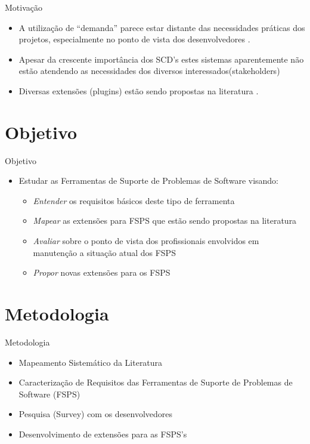 \documentclass[t,14pt,mathserif]{beamer}
\begin{document}
\begin{frame}{Motivação}

	\begin{itemize}
		\item A utilização de  ``demanda'' parece estar distante das necessidades práticas dos projetos, especialmente no ponto de vista dos desenvolvedores \cite{Baysal:2013:SAP:2486788.2486957}.
		\item Apesar da crescente importância dos SCD's estes sistemas aparentemente não estão atendendo as necessidades dos diversos interessados(stakeholders)
		\item Diversas extensões (plugins) estão sendo propostas na literatura \cite{101186,Thung:2014:BIT:2635868.2661678,Kononenko:2014:DED:2591062.2591075}.
	\end{itemize}	
	
\end{frame}


\section{Objetivo}

\begin{frame}{Objetivo}
	
	\begin{itemize}
		\item Estudar as Ferramentas de Suporte de Problemas de Software visando:
		  
			\begin{itemize}
				\item \textit{Entender} os requisitos básicos deste tipo de ferramenta
				\item \textit{Mapear} as extensões para FSPS que estão sendo propostas na literatura
				\item \textit{Avaliar} sobre o ponto de vista dos profissionais envolvidos em manutenção  a situação atual dos FSPS
				\item \textit{Propor} novas extensões para os FSPS
			\end{itemize}
		
	\end{itemize}	
	
\end{frame}

\section{Metodologia}
\begin{frame}{Metodologia}
	\begin{itemize}
		\item Mapeamento Sistemático da Literatura \cite{kitchenham2007guidelines}
		\item Caracterização de Requisitos das Ferramentas de Suporte de Problemas de Software (FSPS)
		\item Pesquisa (Survey) com os desenvolvedores \cite{wohlin2012experimentation}
		\item Desenvolvimento de extensões para as FSPS's
	\end{itemize}
\end{frame}
\end{document}
